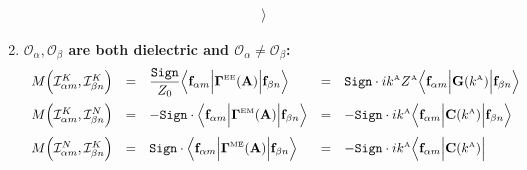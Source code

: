 \documentclass[letterpaper]{article}
\begin{document}
\begin{enumerate}
$$\begin{array}{lclcl}
{                  \Big\rangle
               }
\end{array}$$
\item \textbf{ $\mathcal{O}_\alpha, \mathcal{O}_\beta$ are both
               dielectric and $\mathcal{O}_\alpha \ne \mathcal{O}_\beta$:}
$$\begin{array}{lclcl}
 M\Big( \mathcal{I}^K_{\alpha m}, \mathcal{I}^K_{\beta n} \Big) 
  &=& 
  \displaystyle{ \frac{\texttt{Sign}}{Z_0} 
                 \Big\langle \mathbf{f}_{\alpha m} 
                 \Big| \boldsymbol{\Gamma}^{\hbox{\tiny{EE}}}(\mathbf{A}) \Big|
                 \mathbf{f}_{\beta n} 
                 \Big\rangle
               }
  &=&
  \displaystyle{ \texttt{Sign}\cdot ik^{\hbox{\tiny{A}}} Z^{\hbox{\tiny{A}}}
                 \Big\langle \mathbf{f}_{\alpha m} 
                 \Big| \mathbf{G}(k^{\hbox{\tiny{A}}}) \Big|
                 \mathbf{f}_{\beta n} 
                 \Big\rangle
               }
\\[10pt]
 M\Big( \mathcal{I}^K_{\alpha m}, \mathcal{I}^N_{\beta n} \Big) 
  &=&
  \displaystyle{ -\texttt{Sign}\cdot
                 \Big\langle 
                 \mathbf{f}_{\alpha m} 
                 \Big|\boldsymbol{\Gamma}^{\hbox{\tiny{EM}}}(\mathbf{A}) \Big|
                 \mathbf{f}_{\beta n} 
                 \Big\rangle
               }
  &=&
  \displaystyle{ -\texttt{Sign}\cdot ik^{\hbox{\tiny{A}}}
                  \Big\langle 
                  \mathbf{f}_{\alpha m} 
                  \Big| \mathbf{C}(k^{\hbox{\tiny{A}}})\Big|
                  \mathbf{f}_{\beta n} 
                  \Big\rangle
               }
\\[10pt]
 M\Big( \mathcal{I}^N_{\alpha m}, \mathcal{I}^K_{\beta n} \Big) 
  &=&
  \displaystyle{ \texttt{Sign}\cdot
                 \Big\langle 
                 \mathbf{f}_{\alpha m} 
                 \Big|\boldsymbol{\Gamma}^{\hbox{\tiny{ME}}}(\mathbf{A}) \Big|
                 \mathbf{f}_{\beta n} 
                 \Big\rangle
               }
  &=&
  \displaystyle{ -\texttt{Sign}\cdot ik^{\hbox{\tiny{A}}}
                  \Big\langle 
                  \mathbf{f}_{\alpha m} 
                  \Big| \mathbf{C}(k^{\hbox{\tiny{A}}})\Big|
}
\end{array}$$
\end{enumerate}
\end{document}
